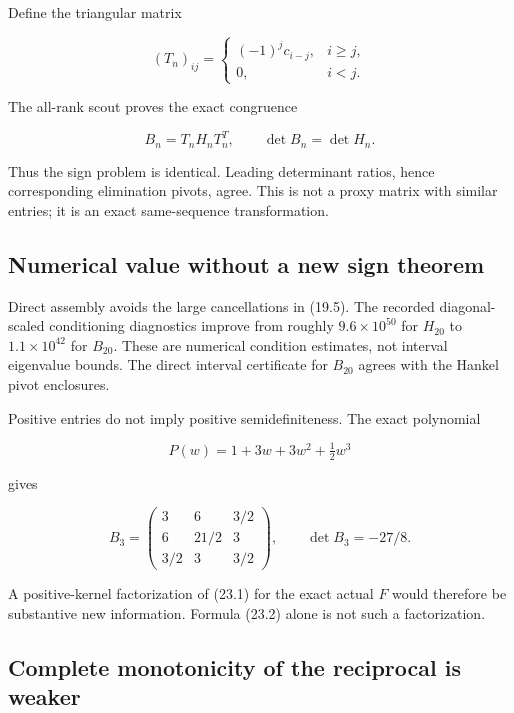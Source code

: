 \documentclass[
  10pt,
  a4paper,
  10pt,
  oneside,
  openany]{book}
\begin{document}
Define the triangular matrix

\[
(T_n)_{ij}=\begin{cases}(-1)^jc_{i-j},&i\ge j,\\0,&i<j.
\end{cases}
\tag{23.3}\label{eq:23.3}
\]

The all-rank scout proves the exact congruence

\[
B_n=T_nH_nT_n^T,
\qquad\det B_n=\det H_n.
\tag{23.4}\label{eq:23.4}
\]

Thus the sign problem is identical. Leading determinant ratios, hence
corresponding elimination pivots, agree. This is not a proxy matrix with
similar entries; it is an exact same-sequence transformation.

\subsection{Numerical value without a new sign
theorem}\label{numerical-value-without-a-new-sign-theorem}

Direct assembly avoids the large cancellations in (19.5). The recorded
diagonal-scaled conditioning diagnostics improve from roughly
\(9.6\times10^{50}\) for \(H_{20}\) to \(1.1\times10^{42}\) for
\(B_{20}\). These are numerical condition estimates, not interval
eigenvalue bounds. The direct interval certificate for \(B_{20}\) agrees
with the Hankel pivot enclosures.

Positive entries do not imply positive semidefiniteness. The exact
polynomial

\[
P(w)=1+3w+3w^2+\tfrac12w^3
\tag{23.5}\label{eq:23.5}
\]

gives

\[
B_3=\begin{pmatrix}3&6&3/2\\6&21/2&3\\3/2&3&3/2\end{pmatrix},
\qquad\det B_3=-27/8.
\tag{23.6}\label{eq:23.6}
\]

A positive-kernel factorization of (23.1) for the exact actual \(F\)
would therefore be substantive new information. Formula (23.2) alone is
not such a factorization.

\subsection{Complete monotonicity of the reciprocal is
weaker}\label{complete-monotonicity-of-the-reciprocal-is-weaker}
\end{document}
